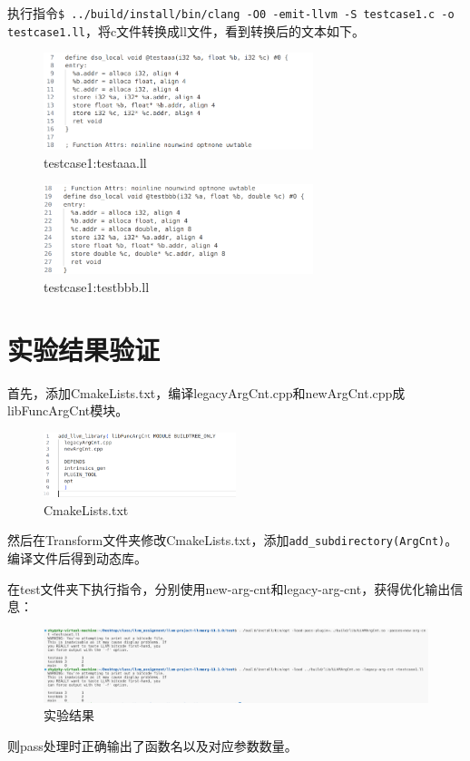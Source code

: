 \documentclass[11pt, a4paper, oneside,UTF8]{ctexart}
\begin{document}
执行指令\texttt{\$ ../build/install/bin/clang -O0 -emit-llvm -S testcase1.c -o testcase1.ll}，将c文件转换成ll文件，看到转换后的文本如下。
\begin{figure}[h]
    \centering
    \includegraphics[width=0.7\textwidth]{./figure/test_2.png}
    \caption{testcase1:testaaa.ll}
    \label{figure:3.2}
\end{figure}
\begin{figure}[h]
    \centering
    \includegraphics[width=0.7\textwidth]{./figure/test_3.png}
    \caption{testcase1:testbbb.ll}
    \label{figure:3.3}
\end{figure}

\section{实验结果验证}

首先，添加CmakeLists.txt，编译legacyArgCnt.cpp和newArgCnt.cpp成libFuncArgCnt模块。
\begin{figure}[h]
    \centering
    \includegraphics[width=0.5\textwidth]{./figure/cmake_1.png}
    \caption{CmakeLists.txt}
    \label{figure:4.1}
\end{figure}

然后在Transform文件夹修改CmakeLists.txt，添加\texttt{add\_subdirectory(ArgCnt)}。编译文件后得到动态库。

在test文件夹下执行指令，分别使用new-arg-cnt和legacy-arg-cnt，获得优化输出信息：

\begin{figure}[h]
    \centering
    \includegraphics[width=1\textwidth]{./figure/result.png}
    \caption{实验结果}
    \label{figure:5.1}
\end{figure}
则pass处理时正确输出了函数名以及对应参数数量。
\end{document}
